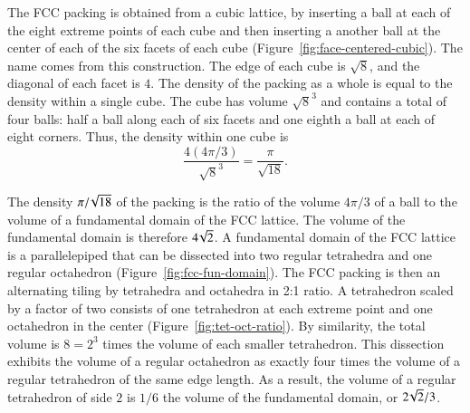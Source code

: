 The FCC packing is obtained from a cubic lattice, by inserting a ball
at each of the eight extreme points of each cube and then inserting a
another ball at the center of each of the six facets of each cube
(Figure~\ref{fig:face-centered-cubic}).  The name
 comes from this construction.  The edge
of each cube is $\sqrt8$, and the diagonal of each facet is $4$.  The
density of the packing as a whole is equal to the density within a
single cube.  The cube has volume $\sqrt8^3$ and contains a total of
four balls: half a ball along each of six facets and one eighth a ball
at each of eight corners.  Thus, the density within one cube is
   \[ 
   \frac{   4 (4\pi/3)}{\sqrt8^3} = \frac{\pi}{\sqrt{18}}.
   \] 


\figTCFVGTS %



The density $\pi/\!\sqrt{18}$ of the packing is the ratio of the volume
$4\pi/3$ of a ball to the volume of a fundamental domain of the FCC
lattice.  The volume of the fundamental domain is therefore
$4\!\sqrt{2}$.  A fundamental domain of the FCC lattice is a
parallelepiped that can be dissected into two regular tetrahedra and
one regular octahedron (Figure~\ref{fig:fcc-fun-domain}).  The FCC
packing is then an alternating tiling by tetrahedra and octahedra in
2:1 ratio.  A tetrahedron scaled by a factor of two consists of one
tetrahedron at each extreme point and one octahedron in the center
(Figure~\ref{fig:tet-oct-ratio}). By similarity, the total volume is
$8 = 2^3$ times the volume of each smaller tetrahedron. This
dissection exhibits the volume of a regular octahedron as exactly four
times the volume of a regular tetrahedron of the same edge length.  As
a result, the volume of a regular tetrahedron of side $2$ is $1/6$ the
volume of the fundamental domain, or $2\!\sqrt{2}/3$.

